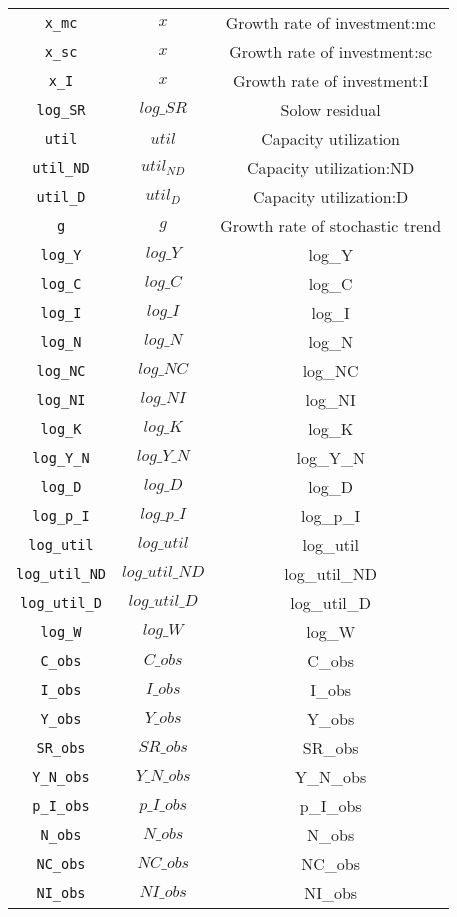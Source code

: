 \begin{center}
\begin{longtable}{ccc}
\texttt{x\_mc} & ${x}$ & Growth rate of investment:mc\\
\texttt{x\_sc} & ${x}$ & Growth rate of investment:sc\\
\texttt{x\_I} & ${x}$ & Growth rate of investment:I\\
\texttt{log\_SR} & $log\_SR$ & Solow residual\\
\texttt{util} & ${util}$ & Capacity utilization\\
\texttt{util\_ND} & ${util_{ND}}$ & Capacity utilization:ND\\
\texttt{util\_D} & ${util_D}$ & Capacity utilization:D\\
\texttt{g} & ${g}$ & Growth rate of stochastic trend\\
\texttt{log\_Y} & $log\_Y$ & log\_Y\\
\texttt{log\_C} & $log\_C$ & log\_C\\
\texttt{log\_I} & $log\_I$ & log\_I\\
\texttt{log\_N} & $log\_N$ & log\_N\\
\texttt{log\_NC} & $log\_NC$ & log\_NC\\
\texttt{log\_NI} & $log\_NI$ & log\_NI\\
\texttt{log\_K} & $log\_K$ & log\_K\\
\texttt{log\_Y\_N} & $log\_Y\_N$ & log\_Y\_N\\
\texttt{log\_D} & $log\_D$ & log\_D\\
\texttt{log\_p\_I} & $log\_p\_I$ & log\_p\_I\\
\texttt{log\_util} & $log\_util$ & log\_util\\
\texttt{log\_util\_ND} & $log\_util\_ND$ & log\_util\_ND\\
\texttt{log\_util\_D} & $log\_util\_D$ & log\_util\_D\\
\texttt{log\_W} & $log\_W$ & log\_W\\
\texttt{C\_obs} & $C\_obs$ & C\_obs\\
\texttt{I\_obs} & $I\_obs$ & I\_obs\\
\texttt{Y\_obs} & $Y\_obs$ & Y\_obs\\
\texttt{SR\_obs} & $SR\_obs$ & SR\_obs\\
\texttt{Y\_N\_obs} & $Y\_N\_obs$ & Y\_N\_obs\\
\texttt{p\_I\_obs} & $p\_I\_obs$ & p\_I\_obs\\
\texttt{N\_obs} & $N\_obs$ & N\_obs\\
\texttt{NC\_obs} & $NC\_obs$ & NC\_obs\\
\texttt{NI\_obs} & $NI\_obs$ & NI\_obs\\

\end{longtable}
\end{center}
